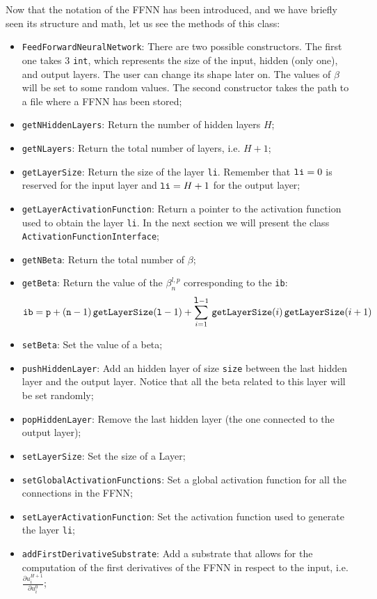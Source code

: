 \documentclass[11pt,a4paper,twoside]{article}
\begin{document}
Now that the notation of the FFNN has been introduced, and we have briefly seen its structure and math, let us see the methods of this class:
\begin{itemize}
   \item \verb+FeedForwardNeuralNetwork+: There are two possible constructors. The first one takes $3$ \verb+int+, which represents the size of the input, hidden (only one), and output layers. The user can change its shape later on. The values of $\beta$ will be set to some random values. The second constructor takes the path to a file where a FFNN has been stored;
   \item \verb+getNHiddenLayers+: Return the number of hidden layers $H$;
   \item \verb+getNLayers+: Return the total number of layers, i.e. $H+1$;
   \item \verb+getLayerSize+: Return the size of the layer \verb+li+. Remember that $\verb+li+=0$ is reserved for the input layer and $\verb+li+=H+1$ for the output layer;
   \item \verb+getLayerActivationFunction+: Return a pointer to the activation function used to obtain the layer \verb+li+. In the next section we will present the class \verb+ActivationFunctionInterface+;
   \item \verb+getNBeta+: Return the total number of $\beta$;
   \item \verb+getBeta+: Return the value of the $\beta^{l,p}_n$ corresponding to the \verb+ib+:
   $$
   {\verb+ib+} = {\verb+p+} + ({\verb+n+}-1) \, \verb+getLayerSize+({\verb+l+}-1) + \sum_{i=1}^{{\verb+l+}-1} \, \verb+getLayerSize+(i) \, \verb+getLayerSize+(i+1)
   $$
   \item \verb+setBeta+: Set the value of a beta;
   \item \verb+pushHiddenLayer+: Add an hidden layer of size \verb+size+ between the last hidden layer and the output layer. Notice that all the beta related to this layer will be set randomly;
   \item \verb+popHiddenLayer+: Remove the last hidden layer (the one connected to the output layer);
   \item \verb+setLayerSize+: Set the size of a Layer;
   \item \verb+setGlobalActivationFunctions+: Set a global activation function for all the connections in the FFNN;
   \item \verb+setLayerActivationFunction+: Set the activation function used to generate the layer \verb+li+;
   \item \verb+addFirstDerivativeSubstrate+: Add a substrate that allows for the computation of the first derivatives of the FFNN in respect to the input, i.e. $\frac{\partial u^{H+1}_i}{\partial u^0_i}$;

\end{itemize}
\end{document}
